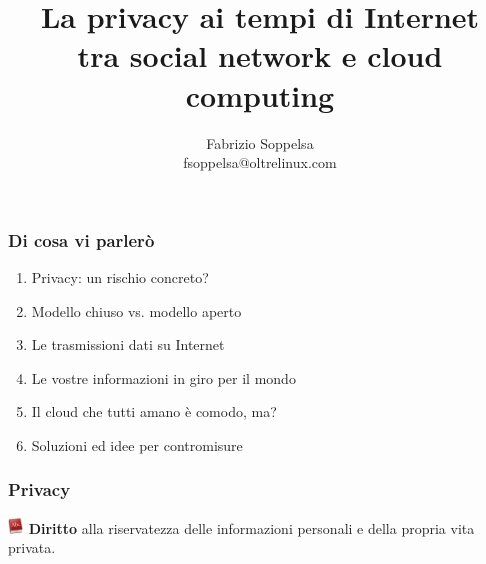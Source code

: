 \documentclass[xcolor=svgnames,handout]{beamer}
\title[Noi ai tempi dei social network e del cloud computing]{La privacy ai tempi di Internet \\ tra social network e cloud computing}
\author{Fabrizio Soppelsa \\ fsoppelsa@oltrelinux.com}
\date{}
\begin{document}
\frame[plain]{\titlepage}
\begin{frame}
	\frametitle{Di cosa vi parlerò}

	\begin{enumerate}
				\pause
		\item Privacy: un rischio concreto?
				\pause
		\item Modello chiuso vs. modello aperto
				\pause
		\item Le trasmissioni dati su Internet
				\pause
		\item Le vostre informazioni in giro per il mondo
				\pause
		\item Il cloud che tutti amano è comodo, ma?
				\pause
		\item Soluzioni ed idee per contromisure
	\end{enumerate}
\end{frame}
\begin{frame}
	\frametitle{Privacy}

	\begin{block}{\includegraphics[width=16px]{img/dictionary.png}}
		{\bf Diritto} alla riservatezza delle informazioni personali e della propria vita privata.
	\end{block}

		\pause

		
		\pause


\end{frame}
\end{document}

